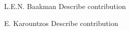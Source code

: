 \begin{IEEEbiographynophoto}{L.E.N. Baakman}
Describe contribution
\end{IEEEbiographynophoto}

\begin{IEEEbiographynophoto}{E. Karountzos}
Describe contribution
\end{IEEEbiographynophoto}